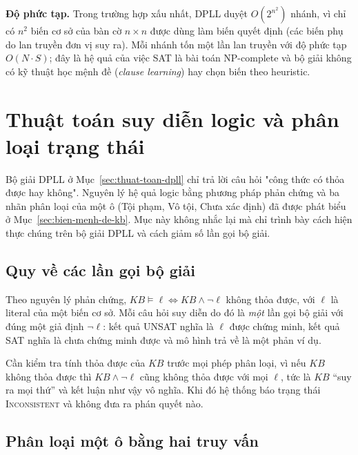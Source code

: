 \textbf{Độ phức tạp.} Trong trường hợp xấu nhất, DPLL duyệt $O(2^{n^2})$ nhánh, vì chỉ có $n^2$ biến cơ sở của bàn cờ $n \times n$ được dùng làm biến quyết định (các biến phụ do lan truyền đơn vị suy ra). Mỗi nhánh tốn một lần lan truyền với độ phức tạp $O(N \cdot S)$; đây là hệ quả của việc SAT là bài toán NP-complete và bộ giải không có kỹ thuật học mệnh đề (\emph{clause learning}) hay chọn biến theo heuristic.

\section{Thuật toán suy diễn logic và phân loại trạng thái}
\label{sec:suy-dien-logic}

Bộ giải DPLL ở Mục~\ref{sec:thuat-toan-dpll} chỉ trả lời câu hỏi "công thức có thỏa được hay không". Nguyên lý hệ quả logic bằng phương pháp phản chứng và ba nhãn phân loại của một ô (Tội phạm, Vô tội, Chưa xác định) đã được phát biểu ở Mục~\ref{sec:bien-menh-de-kb}. Mục này không nhắc lại mà chỉ trình bày cách hiện thực chúng trên bộ giải DPLL và cách giảm số lần gọi bộ giải.

\subsection{Quy về các lần gọi bộ giải}
\label{subsec:he-qua-logic}

Theo nguyên lý phản chứng, $KB \models \ell \iff KB \land \neg\ell$ không thỏa được, với $\ell$ là literal của một biến cơ sở. Mỗi câu hỏi suy diễn do đó là \emph{một} lần gọi bộ giải với đúng một giả định $\neg\ell$: kết quả UNSAT nghĩa là $\ell$ được chứng minh, kết quả SAT nghĩa là chưa chứng minh được và mô hình trả về là một phản ví dụ.

Cần kiểm tra tính thỏa được của $KB$ trước mọi phép phân loại, vì nếu $KB$ không thỏa được thì $KB \land \neg\ell$ cũng không thỏa được với mọi $\ell$, tức là $KB$ ``suy ra mọi thứ'' và kết luận như vậy vô nghĩa. Khi đó hệ thống báo trạng thái \textsc{Inconsistent} và không đưa ra phán quyết nào.

\subsection{Phân loại một ô bằng hai truy vấn}
\label{subsec:phan-loai-mot-o}

